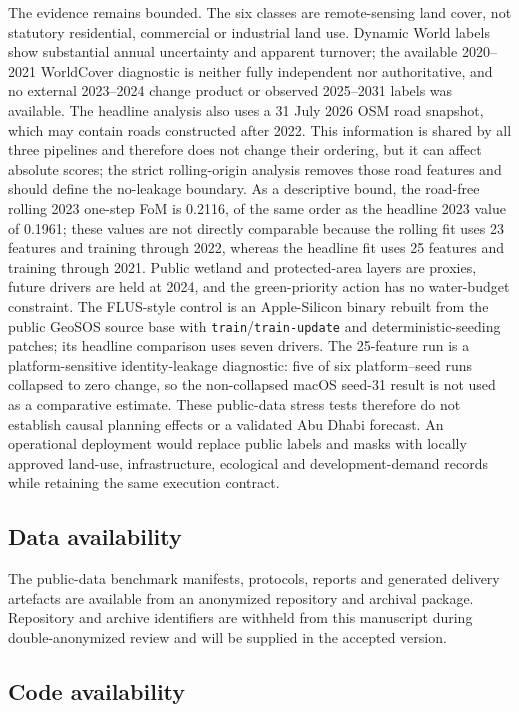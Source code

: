 The evidence remains bounded. The six classes are remote-sensing land
cover, not statutory residential, commercial or industrial land use.
Dynamic World labels show substantial annual uncertainty and apparent
turnover; the available 2020--2021 WorldCover diagnostic is neither
fully independent nor authoritative, and no external 2023--2024 change
product or observed 2025--2031 labels was available. The headline
analysis also uses a 31 July 2026 OSM road snapshot, which may contain
roads constructed after 2022. This information is shared by all three
pipelines and therefore does not change their ordering, but it can
affect absolute scores; the strict rolling-origin analysis removes those
road features and should define the no-leakage boundary. As a
descriptive bound, the road-free rolling 2023 one-step FoM is 0.2116, of
the same order as the headline 2023 value of 0.1961; these values are
not directly comparable because the rolling fit uses 23 features and
training through 2022, whereas the headline fit uses 25 features and
training through 2021. Public wetland and protected-area layers are
proxies, future drivers are held at 2024, and the green-priority action
has no water-budget constraint. The FLUS-style control is an
Apple-Silicon binary rebuilt from the public GeoSOS source base with
\texttt{train}/\texttt{train-update} and deterministic-seeding patches;
its headline comparison uses seven drivers. The 25-feature run is a
platform-sensitive identity-leakage diagnostic: five of six
platform--seed runs collapsed to zero change, so the non-collapsed macOS
seed-31 result is not used as a comparative estimate. These public-data
stress tests therefore do not establish causal planning effects or a
validated Abu Dhabi forecast. An operational deployment would replace
public labels and masks with locally approved land-use, infrastructure,
ecological and development-demand records while retaining the same
execution contract.

\subsection{Data availability}\label{data-availability}

The public-data benchmark manifests, protocols, reports and generated
delivery artefacts are available from an anonymized repository and
archival package. Repository and archive identifiers are withheld from
this manuscript during double-anonymized review and will be supplied in
the accepted version.

\subsection{Code availability}\label{code-availability}

